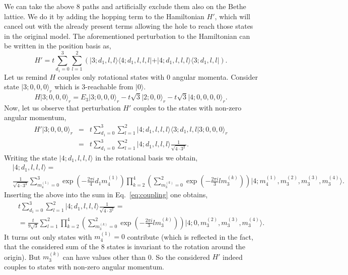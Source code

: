 \documentclass[10pt, a4paper, onecolumn]{article}
\newcommand{\ket}[1]{\vert #1 \rangle}
\newcommand{\bra}[1]{\langle #1 \vert}
\newcommand{\mean}[1]{\langle#1\rangle}
\begin{document}
We can take the above 8 paths and artificially exclude them also on the Bethe lattice. We do it by adding the hopping term to the Hamiltonian $H'$, which will cancel out with the already present terms allowing the hole to reach those states in the original model. The aforementioned perturbation to the Hamiltonian can be written in the position basis as,
\begin{equation}
	H' = t \sum_{d_1 = 0}^3 \sum_{l=1}^2 \left(\ket{3;d_1,l,l}\bra{4;d_1,l,l,l} + \ket{4;d_1,l,l,l}\bra{3;d_1,l,l}\right).
\end{equation}
Let us remind $H$ couples only rotational states with 0 angular momenta. Consider state $\ket{3;0,0,0}_r$ which is 3-reachable from $\ket{0}$.
\begin{equation}
	H\ket{3;0,0,0}_r = E_3\ket{3;0,0,0}_r -t\sqrt{3} \ket{2;0,0}_r -t\sqrt{3}\ket{4;0,0,0,0}_r.
\end{equation}
Now, let us observe that perturbation $H'$ couples to the states with non-zero angular momentum, 
\begin{eqnarray}
	H'\ket{3;0,0,0}_r 
	&=& t \sum_{d_1 = 0}^3 \sum_{l=1}^2 \ket{4;d_1,l,l,l}\mean{3;d_1,l,l \vert 3;0,0,0}_r \\
	&=& t \sum_{d_1 = 0}^3 \sum_{l=1}^2 \ket{4;d_1,l,l,l} \frac{1}{\sqrt{4 \cdot 3^2}}. 
	\label{eq:coupling}
\end{eqnarray}
Writing the state $\ket{4;d_1,l,l,l}$ in the rotational basis we obtain,
\begin{equation}
\begin{aligned}
	&\ket{4;d_1,l,l,l} = \\
	&\frac{1}{\sqrt{4 \cdot 3^3}} \sum_{m^{(1)}_4=0}^3 \exp\left(-\frac{2 \pi i}{4}d_1 m^{(1)}_4\right) \prod_{k=2}^4 \left(\sum_{m^{(k)}_3=0}^2  \exp\left(-\frac{2 \pi i}{3}l m^{(k)}_3\right) \right)\ket{4;m^{(1)}_4,m^{(2)}_3,m^{(3)}_3,m^{(4)}_3}.
\end{aligned}
\end{equation}
Inserting the above into the sum in Eq.~\ref{eq:coupling} one obtains,
\begin{eqnarray}
	&&t\sum_{d_1=0}^3 \sum_{l=1}^2 \ket{4;d_1,l,l,l} \frac{1}{\sqrt{4 \cdot 3^2}} = \\
	&&=\frac{t}{9\sqrt{3}} \sum_{l=1}^2 \prod_{k=2}^4 \left(\sum_{m^{(k)}_3=0}^2  \exp\left(-\frac{2 \pi i}{3}l m^{(k)}_3\right) \right)\ket{4;0,m^{(2)}_3,m^{(3)}_3,m^{(4)}_3}.
\end{eqnarray}
It turns out only states with $m^{(1)}_4 = 0$ contribute (which is reflected in the fact, that the considered sum of the 8 states is invariant to the rotation around the origin). But $m^{(k)}_3$ can have values other than 0. So the considered $H'$ indeed couples to states with non-zero angular momentum.
\end{document}
